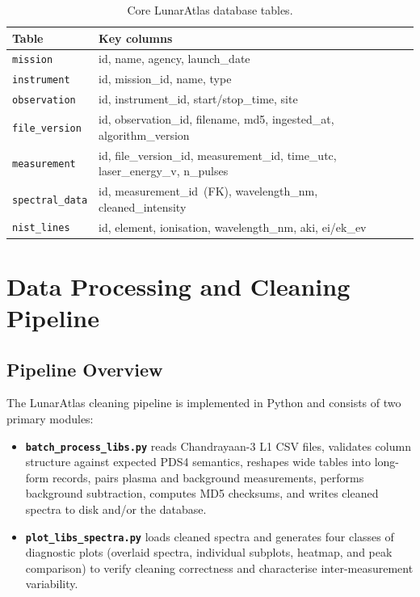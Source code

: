 \documentclass[a4paper,twocolumn,10pt]{article}
\begin{document}
\begin{table}[htbp]
\centering
\caption{Core LunarAtlas database tables.}
\label{tab:schema}
{\small
\begin{tabularx}{\columnwidth}{@{}lX@{}}
\toprule
\textbf{Table} & \textbf{Key columns} \\
\midrule
\texttt{mission} & id, name, agency, launch\_date \\
\addlinespace
\texttt{instrument} & id, mission\_id, name, type \\
\addlinespace
\texttt{observation} & id, instrument\_id, start/stop\_time, site \\
\addlinespace
\texttt{file\_version} & id, observation\_id, filename, md5,
  ingested\_at, algorithm\_version \\
\addlinespace
\texttt{measurement} & id, file\_version\_id, measurement\_id,
  time\_utc, laser\_energy\_v, n\_pulses \\
\addlinespace
\texttt{spectral\_data} & id, measurement\_id~(FK),
  wavelength\_nm, cleaned\_intensity \\
\addlinespace
\texttt{nist\_lines} & id, element, ionisation,
  wavelength\_nm, aki, ei/ek\_ev \\
\bottomrule
\end{tabularx}
}
\end{table}


\section{Data Processing and Cleaning Pipeline}
\label{sec:processing}

\subsection{Pipeline Overview}

The LunarAtlas cleaning pipeline is implemented in Python and consists
of two primary modules:

\begin{itemize}[nosep,leftmargin=*]
  \item \textbf{\texttt{batch\_process\_libs.py}} reads Chandrayaan-3
    L1 CSV files, validates column structure against expected PDS4
    semantics, reshapes wide tables into long-form records, pairs
    plasma and background measurements, performs background
    subtraction, computes MD5 checksums, and writes cleaned spectra to
    disk and/or the database.

  \item \textbf{\texttt{plot\_libs\_spectra.py}} loads cleaned spectra
    and generates four classes of diagnostic plots (overlaid spectra,
    individual subplots, heatmap, and peak comparison) to verify
    cleaning correctness and characterise inter-measurement variability.
\end{itemize}
\end{document}
